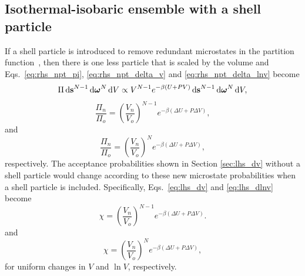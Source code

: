 \begin{figure}

\end{figure}

\subsection{\label{sec:rhs_npt_no_shell}Isothermal-isobaric ensemble with a shell particle}

If a shell particle is introduced to remove redundant microstates in the partition function~\cite{attard_density_1995, koper_length_1996, corti_deriving_1998, han_isothermal-isobaric_2001, corti_isothermal-isobaric_2001, corti_monte_2002, stroker_systematic_2021, hatch_theory_2024}, then there is one less particle that is scaled by the volume and Eqs.~\ref{eq:rhs_npt_pi}, \ref{eq:rhs_npt_delta_v} and \ref{eq:rhs_npt_delta_lnv} become
\begin{equation}
\Pi \mathop{}\!\mathrm{d}\mathbf{s}^{N-1}\mathop{}\!\mathrm{d}\boldsymbol{\omega}^{N}\mathop{}\!\mathrm{d} V \propto V^{N-1} e^{-\beta(U+P V)} \mathop{}\!\mathrm{d}\mathbf{s}^{N-1} \mathop{}\!\mathrm{d}\boldsymbol{\omega}^{N}\mathop{}\!\mathrm{d} V,
\end{equation}
\begin{equation}
\frac{\Pi_n}{\Pi_o} = \left(\frac{V_n}{V_o}\right)^{N-1}e^{-\beta(\Delta U + P\Delta V)},
\end{equation}
and
\begin{equation}
\frac{\Pi_n}{\Pi_o} = \left(\frac{V_n}{V_o}\right)^{N}e^{-\beta(\Delta U + P\Delta V)},
\end{equation}
respectively.
The acceptance probabilities shown in Section \ref{sec:lhs_dv} without a shell particle would change according to these new microstate probabilities when a shell particle is included.
Specifically, Eqs.~\ref{eq:lhs_dv} and \ref{eq:lhs_dlnv} become
\begin{equation}
\chi=\left(\frac{V_n}{V_o}\right)^{N-1}e^{-\beta(\Delta U + P\Delta V)}.
\end{equation}
and
\begin{equation}
\chi=\left(\frac{V_n}{V_o}\right)^{N}e^{-\beta(\Delta U + P\Delta V)},
\end{equation}
for uniform changes in $V$ and $\ln V$, respectively.
